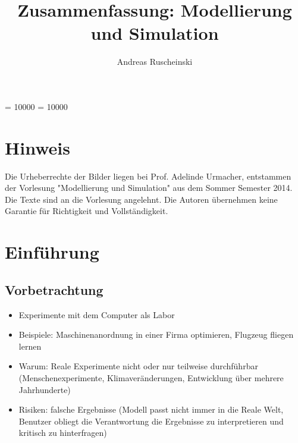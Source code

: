 \documentclass[11pt, fleqn, a4paper, leqno]{scrartcl} %
\title{Zusammenfassung: Modellierung und Simulation}
\author{Andreas Ruscheinski}
\date{}
\begin{document}
\maketitle
\tableofcontents
\widowpenalty = 10000
\clubpenalty = 10000

\section{Hinweis}
Die Urheberrechte der Bilder liegen bei Prof. Adelinde Urmacher, entstammen der Vorlesung "Modellierung und Simulation" aus dem Sommer Semester 2014. Die Texte sind an die Vorlesung angelehnt. Die Autoren übernehmen keine Garantie für Richtigkeit und Vollständigkeit.
\section{Einführung}
	\subsection{Vorbetrachtung}
	\begin{itemize}
		\item Experimente mit dem Computer als Labor
		\item Beispiele: Maschinenanordnung in einer Firma optimieren, Flugzeug fliegen lernen 
		\item Warum: Reale Experimente nicht oder nur teilweise durchführbar (Menschenexperimente, Klimaveränderungen, Entwicklung über mehrere Jahrhunderte)
		\item Risiken: falsche Ergebnisse (Modell passt nicht immer in die Reale Welt, Benutzer obliegt die Verantwortung die Ergebnisse zu interpretieren und kritisch zu hinterfragen)
	\end{itemize}
\end{document}

